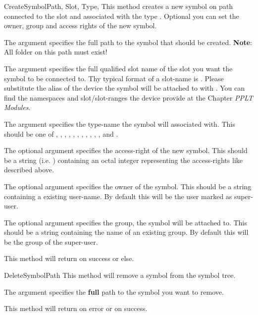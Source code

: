 \begin{methoddesc}[System]{CreateSymbol}{Path, Slot, Type, }
This method creates a new symbol on path  connected to the slot  and associated with the type
. Optional you can set the owner, group and access rights of the new symbol.

The argument  specifies the full path to the symbol that should be 
created. \textbf{Note}: All folder on this path must exist! 

The argument  specifies the full qualified slot name of the slot you
want the symbol to be connected to. Thy typical format of a slot-name is 
. Please substitute the alias of the device
the symbol will be attached to with . You can find the 
namespaces and slot/slot-ranges the device provide at the Chapter 
\emph{PPLT Modules}.

The argument  specifies the type-name the symbol will associated 
with. This should be one of , , 
, , , , 
, , ,
, ,  and
.

The optional argument  specifies the access-right of the new symbol.
This should be a string (i.e. ) containing an octal integer 
representing the access-rights like described above.

The optional argument  specifies the owner of the symbol. This
should be a string containing a existing user-name. By default this will be
the user marked as super-user.

The optional argument  specifies the group, the symbol will be 
attached to. This should be a string containing the name of an existing 
group. By default this will be the group of the super-user.

This method will return  on success or  else.
\end{methoddesc}


\begin{methoddesc}[System]{DeleteSymbol}{Path}
This method will remove a symbol from the symbol tree.

The argument  specifies the \textbf{full} path
to the symbol you want to remove. 

This method will return  on error or  on success.
\end{methoddesc}


